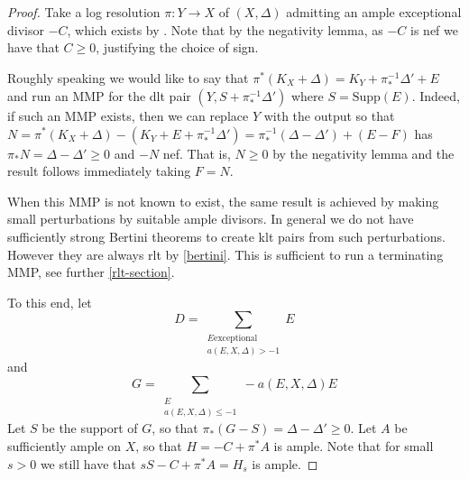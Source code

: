 \begin{proof}
	
	
	Take a log resolution $\pi\colon Y \to X$ of $(X,\Delta)$ admitting an ample exceptional divisor $-C$, which exists by \cite[Theorem 1]{kollar2021resolution}. Note that by the negativity lemma, as $-C$ is nef we have that $C \geq 0$, justifying the choice of sign.
	
	Roughly speaking we would like to say that $\pi^{*}(K_{X}+\Delta)=K_{Y}+\pi_{*}^{-1}\Delta'+E$ and run an MMP for the dlt pair $(Y,S+\pi_{*}^{-1}\Delta')$ where $S=\text{Supp}(E)$. Indeed, if such an MMP exists, then we can replace $Y$ with the output so that $N=\pi^{*}(K_{X}+\Delta)-(K_{Y}+E+\pi_{*}^{-1}\Delta')= \pi_{*}^{-1}(\Delta-\Delta')+(E-F)$ has $\pi_{*}N=\Delta-\Delta' \geq 0$ and $-N$ nef. That is, $N \geq 0$ by the negativity lemma and the result follows immediately taking $F=N$.  
	
	When this MMP is not known to exist, the same result is achieved by making small perturbations by suitable ample divisors. In general we do not have sufficiently strong Bertini theorems to create klt pairs from such perturbations. However they are always rlt by \autoref{bertini}. This is sufficient to run a terminating MMP, see further \autoref{rlt-section}.
	
	To this end, let \[D= \sum_{\substack{E \text{exceptional} \\ a(E,X,\Delta) > -1}} E\]
	and 
		\[G = \sum_{\substack{E \\ a(E,X,\Delta) \leq  -1}} -a(E,X,\Delta)E\]
	Let $S$ be the support of $G$, so that $\pi_{*}(G-S)=\Delta-\Delta' \geq 0.$ Let $A$ be sufficiently ample on $X$, so that $H=-C+\pi^{*}A$ is ample. Note that for small $s > 0$ we still have that $sS -C+\pi^{*}A=H_{s}$ is ample.
	

\end{proof}
